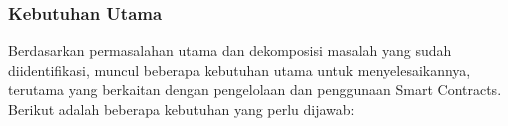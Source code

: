 \subsubsection{Kebutuhan Utama}
\label{subsubsec:kebutuhan-utama}

Berdasarkan permasalahan utama dan dekomposisi masalah yang sudah diidentifikasi, muncul beberapa kebutuhan utama untuk menyelesaikannya, terutama yang berkaitan dengan pengelolaan dan penggunaan Smart Contracts. Berikut adalah beberapa kebutuhan yang perlu dijawab:

